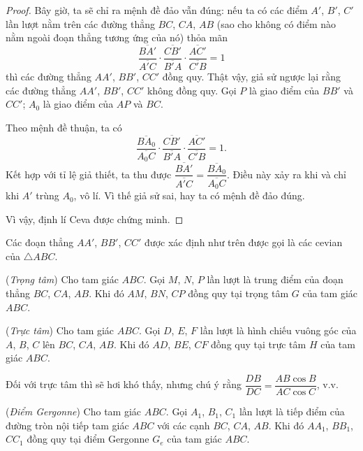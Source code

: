\begin{proof}
            Bây giờ, ta sẽ chỉ ra mệnh đề đảo vẫn đúng: nếu ta có các điểm \(A'\), \(B'\), \(C'\) lần lượt nằm trên các đường thẳng \(BC\), \(CA\), \(AB\) (sao cho không có điểm nào nằm ngoài đoạn thẳng tương ứng của nó) thỏa mãn
            \[\frac{\overline{BA'}}{\overline{A'C}} \cdot \frac{\overline{CB'}}{\overline{B'A}} \cdot \frac{\overline{AC'}}{\overline{C'B}} = 1\]
            thì các đường thẳng \(AA'\), \(BB'\), \(CC'\) đồng quy. Thật vậy, giả sử ngược lại rằng các đường thẳng \(AA'\), \(BB'\), \(CC'\) không đồng quy. Gọi \(P\) là giao điểm của \(BB'\) và \(CC'\); \(A_0\) là giao điểm của \(AP\) và \(BC\).

            Theo mệnh đề thuận, ta có
            \[\frac{\overline{BA_0}}{\overline{A_0C}} \cdot \frac{\overline{CB'}}{\overline{B'A}} \cdot \frac{\overline{AC'}}{\overline{C'B}} = 1.\]
            Kết hợp với tỉ lệ giả thiết, ta thu được \(\dfrac{\overline{BA'}}{\overline{A'C}} = \dfrac{\overline{BA_0}}{\overline{A_0C}}\). Điều này xảy ra khi và chỉ khi \(A'\) trùng \(A_0\), vô lí. Vì thế giả sử sai, hay ta có mệnh đề đảo đúng.

            Vì vậy, định lí Ceva được chứng minh.
        \end{proof}

        \begin{definition}
            Các đoạn thẳng \(AA'\), \(BB'\), \(CC'\) được xác định như trên được gọi là các cevian của \(\triangle ABC\).
        \end{definition}

        \begin{corollary}
            (\textit{Trọng tâm}) Cho tam giác \(ABC\). Gọi \(M\), \(N\), \(P\) lần lượt là trung điểm của đoạn thẳng \(BC\), \(CA\), \(AB\). Khi đó \(AM\), \(BN\), \(CP\) đồng quy tại trọng tâm \(G\) của tam giác \(ABC\). 
        \end{corollary}

        \begin{corollary}
            (\textit{Trực tâm}) Cho tam giác \(ABC\). Gọi \(D\), \(E\), \(F\) lần lượt là hình chiếu vuông góc của \(A\), \(B\), \(C\) lên \(BC\), \(CA\), \(AB\). Khi đó \(AD\), \(BE\), \(CF\) đồng quy tại trực tâm \(H\) của tam giác \(ABC\). 
        \end{corollary}

        Đối với trực tâm thì sẽ hơi khó thấy, nhưng chú ý rằng \(\dfrac{DB}{DC} = \dfrac{AB \cos B}{AC \cos C}\), v.v.

        \begin{corollary}
            (\textit{Điểm Gergonne}) Cho tam giác \(ABC\). Gọi \(A_1\), \(B_1\), \(C_1\) lần lượt là tiếp điểm của đường tròn nội tiếp tam giác \(ABC\) với các cạnh \(BC\), \(CA\), \(AB\). Khi đó \(AA_1\), \(BB_1\), \(CC_1\) đồng quy tại điểm Gergonne \(G_e\) của tam giác \(ABC\). 
        \end{corollary}

